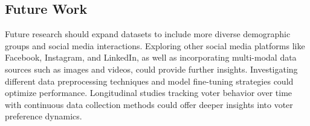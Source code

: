 \documentclass[sigconf,natbib=false]{acmart}
\begin{document}
\subsection{Future Work}
Future research should expand datasets to include more diverse demographic groups and social media interactions. Exploring other social media platforms like Facebook, Instagram, and LinkedIn, as well as incorporating multi-modal data sources such as images and videos, could provide further insights. Investigating different data preprocessing techniques and model fine-tuning strategies could optimize performance. Longitudinal studies tracking voter behavior over time with continuous data collection methods could offer deeper insights into voter preference dynamics.






\appendix
\end{document}
